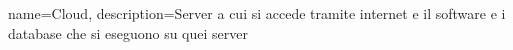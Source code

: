 {
	name={Cloud},
	description={Server a cui si accede tramite internet e il software e i database che si eseguono su quei server}
}